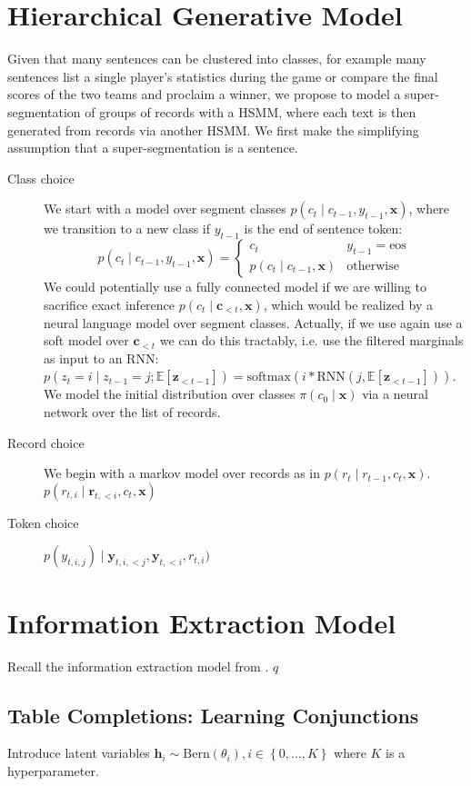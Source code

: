 \documentclass{article}
\newcommand\set[1]{\left\{#1\right\}}
\newcommand\Bern{\mathrm{Bern}}
\newcommand\E[1]{\mathbb{E}\left[#1\right]}
\newcommand{\bc}{\mathbf{c}}
\newcommand{\bh}{\mathbf{h}}
\newcommand{\br}{\mathbf{r}}
\newcommand{\bx}{\mathbf{x}}
\newcommand{\by}{\mathbf{y}}
\newcommand{\bz}{\mathbf{z}}
\begin{document}
\section{Hierarchical Generative Model}
Given that many sentences can be clustered into classes, for example
many sentences list a single player's statistics during the game or 
compare the final scores of the two teams and proclaim a winner,
we propose to model a super-segmentation of groups of records with a HSMM,
where each text is then generated from records via another HSMM.
We first make the simplifying assumption that a super-segmentation is a sentence.

\begin{description}
\item[Class choice]
We start with a model over segment classes $p(c_t\mid c_{t-1},y_{t-1},\bx)$,
where we transition to a new class if $y_{t-1}$ is the end of sentence token:
$$p(c_t\mid c_{t-1},y_{t-1},\bx) = \begin{cases}
c_t & y_{t-1}=\textrm{eos}\\
p(c_t\mid c_{t-1},\bx) & \textrm{otherwise}
\end{cases}$$
We could potentially use a fully connected model if we are willing to sacrifice
exact inference $p(c_t\mid \bc_{<t}, \bx)$, which would be realized by a neural
language model over segment classes.
Actually, if we use again use a soft model over $\bc_{<t}$ we can do this tractably,
i.e. use the filtered marginals as input to an RNN:
$p(z_t=i\mid z_{t-1}=j; \E{\bz_{<t-1}}) = \textrm{softmax}(i * \textrm{RNN}(j, \E{\bz_{<t-1}}))$.
We model the initial distribution over classes $\pi(c_0\mid\bx)$
via a neural network over the list of records.
\item[Record choice]
We begin with a markov model over records as in \citet{liang2009semalign}
$p(r_t\mid r_{t-1},c_t,\bx)$.
$p(r_{t,i}\mid\br_{t,<i},c_t,\bx)$
\item[Token choice]
$p(y_{t,i,j})\mid\by_{t,i,<j},\by_{t,<i},r_{t,i})$
\end{description}

\section{Information Extraction Model}
Recall the information extraction model from \citet{wiseman2017d2t}.
$q$

\subsection{Table Completions: Learning Conjunctions}
Introduce latent variables $\bh_i\sim\Bern(\theta_i),i\in\set{0,\ldots,K}$
where $K$ is a hyperparameter. 
\end{document}
